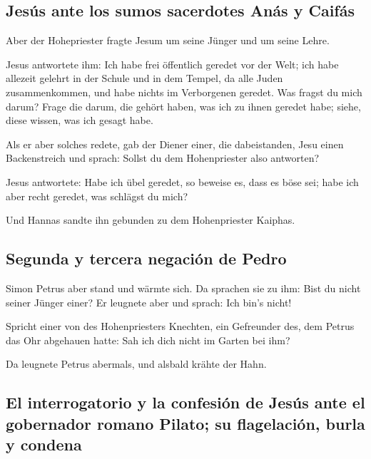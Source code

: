 \hypertarget{jesuxfas-ante-los-sumos-sacerdotes-anuxe1s-y-caifuxe1s}{%
\subsection{Jesús ante los sumos sacerdotes Anás y
Caifás}\label{jesuxfas-ante-los-sumos-sacerdotes-anuxe1s-y-caifuxe1s}}

 Aber der Hohepriester fragte Jesum um seine Jünger und
um seine Lehre.

 Jesus antwortete ihm: Ich habe frei öffentlich geredet
vor der Welt; ich habe allezeit gelehrt in der Schule und in dem Tempel,
da alle Juden zusammenkommen, und habe nichts im Verborgenen geredet.
 Was fragst du mich darum? Frage die darum, die gehört
haben, was ich zu ihnen geredet habe; siehe, diese wissen, was ich
gesagt habe.

 Als er aber solches redete, gab der Diener einer, die
dabeistanden, Jesu einen Backenstreich und sprach: Sollst du dem
Hohenpriester also antworten?

 Jesus antwortete: Habe ich übel geredet, so beweise es,
dass es böse sei; habe ich aber recht geredet, was schlägst du mich?

 Und Hannas sandte ihn gebunden zu dem Hohenpriester
Kaiphas.

\hypertarget{segunda-y-tercera-negaciuxf3n-de-pedro}{%
\subsection{Segunda y tercera negación de
Pedro}\label{segunda-y-tercera-negaciuxf3n-de-pedro}}

 Simon Petrus aber stand und wärmte sich. Da sprachen sie
zu ihm: Bist du nicht seiner Jünger einer? Er leugnete aber und sprach:
Ich bin's nicht!

 Spricht einer von des Hohenpriesters Knechten, ein
Gefreunder des, dem Petrus das Ohr abgehauen hatte: Sah ich dich nicht
im Garten bei ihm?

 Da leugnete Petrus abermals, und alsbald krähte der
Hahn.

\hypertarget{el-interrogatorio-y-la-confesiuxf3n-de-jesuxfas-ante-el-gobernador-romano-pilato-su-flagelaciuxf3n-burla-y-condena}{%
\subsection{El interrogatorio y la confesión de Jesús ante el gobernador
romano Pilato; su flagelación, burla y
condena}\label{el-interrogatorio-y-la-confesiuxf3n-de-jesuxfas-ante-el-gobernador-romano-pilato-su-flagelaciuxf3n-burla-y-condena}}

